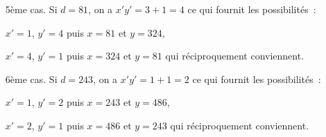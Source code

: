 {{\begin{enumerate}
\begin{itemize}
$x'=1$, $y'=10$ puis $x=27$ et $y=270$,
 
$x'=2$, $y'=5$ puis $x=54$ et $y=135$,

$x'=5$, $y'=2$ puis $x=135$ et $y=54$,
 
$x'=10$, $y'=1$ puis $x=270$ et $y=27$ qui réciproquement conviennent.

\item[5ème cas.] Si $d=81$, on a $x'y'=3+1=4$ ce qui fournit les possibilités~:

$x'=1$, $y'=4$ puis $x=81$ et $y=324$,
 
$x'=4$, $y'=1$ puis $x=324$ et $y=81$ qui réciproquement conviennent.

\item[6ème cas.] Si $d=243$, on a $x'y'=1+1=2$ ce qui fournit les possibilités~:

$x'=1$, $y'=2$ puis $x=243$ et $y=486$,
 
$x'=2$, $y'=1$ puis $x=486$ et $y=243$ qui réciproquement conviennent.
\end{itemize}
\end{enumerate}}
}